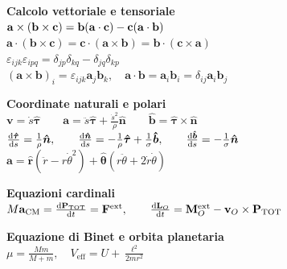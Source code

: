 \documentclass[a4paper,7pt]{article}
\newcommand{\nhat}{\boldsymbol{\hat{n}}}
\newcommand{\that}{\boldsymbol{\hat{\tau}}}
\newcommand{\bhat}{\boldsymbol{\hat{b}}}
\newcommand{\rhat}{\boldsymbol{\hat{r}}}
\newcommand{\thetahat}{\boldsymbol{\hat{\theta}}}
\begin{document}
	\noindent
	\begin{minipage}{0.5\textwidth}
		\textbf{Calcolo vettoriale e tensoriale}\\		
		
		$\mathbf{a}\times\qty(\mathbf{b}\times \mathbf{c})=\mathbf{b}\qty(\mathbf{a}\cdot \mathbf{c})-\mathbf{c}\qty(\mathbf{a}\cdot \mathbf{b})$\\
		
		$\mathbf{a} \cdot (\mathbf{b} \times \mathbf{c}) = \mathbf{c} \cdot (\mathbf{a} \times \mathbf{b})= \mathbf{b} \cdot (\mathbf{c} \times \mathbf{a})$\\	
		
		$\varepsilon_{ijk}\varepsilon_{ipq} = \delta_{jp}\delta_{kq} - \delta_{jq}\delta_{kp}$\\
		
		$(\mathbf{a}\times \mathbf{b})_i=\varepsilon_{ijk}\mathbf{a}_j\mathbf{b}_k, \quad \mathbf{a}\cdot\mathbf{b}=\mathbf{a}_i\mathbf{b}_i=\delta_{ij}\mathbf{a}_i\mathbf{b}_j$
		\vspace{0.5 cm}
		
		\textbf{Coordinate naturali e polari}\\
			
		$\mathbf{v}=\dot{s}\that\qquad \mathbf{a}=\ddot{s}\that+\frac{\dot{s}^2}{\rho}\nhat\qquad \bhat=\that\times\nhat$\\
		
		$\dv{\that}{s} = \frac{1}{\rho} \nhat, \qquad \dv{\nhat}{s}=-\frac{1}{\rho}\that+\frac{1}{\sigma}\bhat, \qquad \dv{\bhat}{s} = -\frac{1}{\sigma} \nhat$\\
		
		$\mathbf{a}=\rhat(\ddot{r}-r\dot{\theta}^2)+\thetahat\left(r\ddot{\theta}+2\dot{r}\dot{\theta}\right)$
		
		\vspace{0.5 cm}
		
		\textbf{Equazioni cardinali}\\
		
		$M\textbf{a}_{\text{CM}}=\dv{\textbf{P}_{\text{TOT}}}{t} = \mathbf{F}^{\text{ext}}, \qquad \dv{\textbf{L}_O}{t}= \mathbf{M}_O^{\text{ext}} - \mathbf{v}_O \times \mathbf{P}_{\text{TOT}}$ \\
		\vspace{0.5 cm}
		
		\textbf{Equazione di Binet e orbita planetaria}\\
		
		$\mu=\frac{Mm}{M+m},\quad V_\text{eff}=U+\frac{\ell^2}{2mr^2}$ \\
		\vspace{0.2 cm}
		

\end{minipage}
\end{document}
